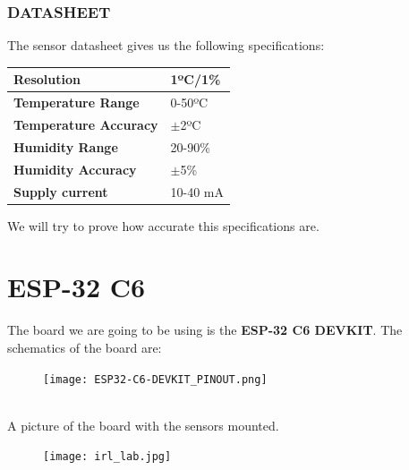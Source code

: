 \documentclass[14pt]{article}
\begin{document}
\begin{normalsize}
				\subsubsection{DATASHEET}
				The sensor datasheet gives us the following specifications:\\
				\renewcommand{\arraystretch}{1.5}
				\begin{table}[h]
					\centering
					\begin{tabular}{|p{5cm}|p{3cm}|}
						\hline
						\textbf{Resolution}&	1ºC/1\%\\\hline
						\textbf{Temperature Range}			&	0-50ºC\\\hline
						\textbf{Temperature Accuracy} & $\pm$2ºC\\\hline
						\textbf{Humidity Range} & 20-90\%\\\hline
						\textbf{Humidity Accuracy} & $\pm$5\%\\\hline
						\textbf{Supply current} & 10-40 mA\\\hline
					\end{tabular}
				\end{table}
				We will try to prove how accurate this specifications are.
			\end{normalsize}
	\newpage
	\section{ESP-32 C6}
	\begin{normalsize}
		The board we are going to be using is the \textbf{ESP-32 C6 DEVKIT}. The schematics of the board are:
		\begin{figure}[h]
			\centering
			\texttt{[image: ESP32-C6-DEVKIT\_PINOUT.png]}
		\end{figure}\\
		A picture of the board with the sensors mounted.\\
		\begin{figure}[h]
			\centering
			\texttt{[image: irl\_lab.jpg]}
		\end{figure}
	\end{normalsize}
\end{document}

